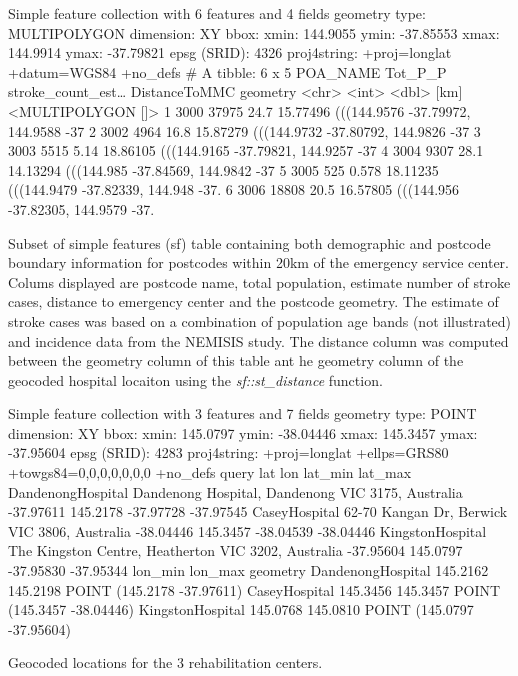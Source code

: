 \documentclass[utf8]{frontiers_suppmat} %
\begin{document}
\begin{table}[h]
\begin{verbnobox}[\fontsize{8pt}{8pt}\selectfont]
Simple feature collection with 6 features and 4 fields
geometry type:  MULTIPOLYGON
dimension:      XY
bbox:           xmin: 144.9055 ymin: -37.85553 xmax: 144.9914 ymax: -37.79821
epsg (SRID):    4326
proj4string:    +proj=longlat +datum=WGS84 +no_defs
# A tibble: 6 x 5
  POA_NAME Tot_P_P stroke_count_est… DistanceToMMC                             geometry
  <chr>      <int>             <dbl>          [km]                   <MULTIPOLYGON []>
1 3000       37975            24.7        15.77496 (((144.9576 -37.79972, 144.9588 -37
2 3002        4964            16.8        15.87279 (((144.9732 -37.80792, 144.9826 -37
3 3003        5515             5.14       18.86105 (((144.9165 -37.79821, 144.9257 -37
4 3004        9307            28.1        14.13294 (((144.985 -37.84569, 144.9842 -37
5 3005         525             0.578      18.11235 (((144.9479 -37.82339, 144.948 -37.
6 3006       18808            20.5        16.57805 (((144.956 -37.82305, 144.9579 -37.
\end{verbnobox}
\caption{Subset of simple features (sf) table containing both demographic and postcode boundary information for postcodes within 20km of the emergency service center. Colums displayed are postcode name, total population, estimate number of stroke cases, distance to emergency center and the postcode geometry. The estimate of stroke cases was based on a combination of population age bands (not illustrated) and incidence data from the NEMISIS study. The distance column was computed between the geometry column of this table ant he geometry column of the geocoded hospital locaiton using the {\em sf::st\_distance} function.\label{tab:MMC20}}
\end{table}

\begin{table}[h]
\begin{verbnobox}[\fontsize{8pt}{8pt}\selectfont]
Simple feature collection with 3 features and 7 fields
geometry type:  POINT
dimension:      XY
bbox:           xmin: 145.0797 ymin: -38.04446 xmax: 145.3457 ymax: -37.95604
epsg (SRID):    4283
proj4string:    +proj=longlat +ellps=GRS80 +towgs84=0,0,0,0,0,0,0 +no_defs
                                                                query       lat      lon   lat_min   lat_max
DandenongHospital   Dandenong Hospital, Dandenong VIC 3175, Australia -37.97611 145.2178 -37.97728 -37.97545
CaseyHospital            62-70 Kangan Dr, Berwick VIC 3806, Australia -38.04446 145.3457 -38.04539 -38.04446
KingstonHospital  The Kingston Centre, Heatherton VIC 3202, Australia -37.95604 145.0797 -37.95830 -37.95344
                   lon_min  lon_max                   geometry
DandenongHospital 145.2162 145.2198 POINT (145.2178 -37.97611)
CaseyHospital     145.3456 145.3457 POINT (145.3457 -38.04446)
KingstonHospital  145.0768 145.0810 POINT (145.0797 -37.95604)
\end{verbnobox}
\caption{Geocoded locations for the 3 rehabilitation centers.\label{tab:georehab}}
\end{table}
\end{document}
